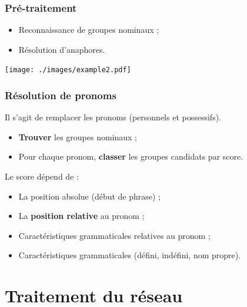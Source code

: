 \documentclass[12pt]{beamer}
\begin{document}
\begin{frame}
 \frametitle{Pré-traitement}
 
  \begin{itemize}
   \item Reconnaissance de groupes nominaux ;
   \item Résolution d'anaphores.
  \end{itemize}

  \texttt{[image: ./images/example2.pdf]}
 
\end{frame}



\begin{frame}
 \frametitle{Résolution de pronoms}
 
 Il s'agit de remplacer les pronoms (personnels et possessifs).
 
  \begin{itemize}
   \item \textbf{Trouver} les groupes nominaux ;
   \item Pour chaque pronom, \textbf{classer} les groupes candidats par score.
  \end{itemize}

  \pause
  
  Le score dépend de :
  \begin{itemize}
   \item La position absolue (début de phrase) ;
   \item La \textbf{position relative} au pronom ;
   \item Caractéristiques grammaticales relatives au pronom ;
   \item Caractéristiques grammaticales (défini, indéfini, nom propre).
  \end{itemize}

 
 
\end{frame}


\section{Traitement du réseau}
\end{document}
